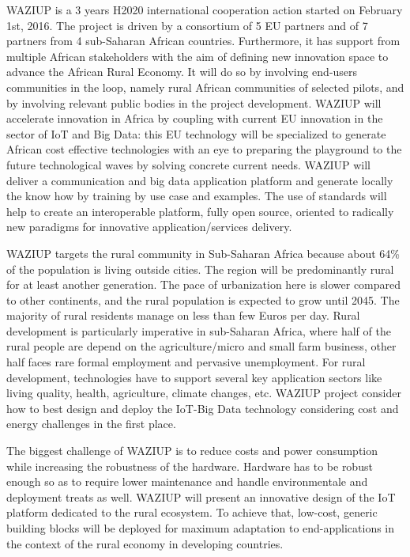 WAZIUP is a 3 years H2020 international cooperation action started on February 1st, 2016.
The project is driven by a consortium of 5 EU partners and of 7 partners from 4 sub-Saharan African countries.
Furthermore, it has support from multiple African stakeholders with the aim of defining new innovation space to advance the African Rural Economy.
It will do so by involving end-users communities in the loop, namely rural African communities of selected pilots, and by involving relevant public bodies in the project development.
WAZIUP will accelerate innovation in Africa by coupling with current EU innovation in the sector of IoT and Big Data: this EU technology will be specialized to generate African cost effective technologies with an eye to preparing the playground to the future technological waves by solving concrete current needs.
WAZIUP will deliver a communication and big data application platform and generate locally the know how by training by use case and examples.
The use of standards will help to create an interoperable platform, fully open source, oriented to radically new paradigms for innovative application/services delivery.

WAZIUP targets the rural community in Sub-Saharan Africa because about 64\% of the population is living outside cities.
The region will be predominantly rural for at least another generation.
The pace of urbanization here is slower compared to other continents, and the rural population is expected to grow until 2045.
The majority of rural residents manage on less than few Euros per day.
Rural development is particularly imperative in sub-Saharan Africa, where half of the rural people are depend on the agriculture/micro and small farm business, other half faces rare formal employment and pervasive unemployment.
For rural development, technologies have to support several key application sectors like living quality, health, agriculture, climate changes, etc.
WAZIUP project consider how to best design and deploy the IoT-Big Data technology considering cost and energy challenges in the first place.

The biggest challenge of WAZIUP is to reduce costs and power consumption while increasing the robustness of the hardware. 
Hardware has to be robust enough so as to require lower maintenance and handle environmentale and deployment treats as well. 
WAZIUP will present an innovative design of the IoT platform dedicated to the rural ecosystem. 
To achieve that, low-cost, generic building blocks will be deployed for maximum adaptation to end-applications in the context of the rural economy in developing countries. 

